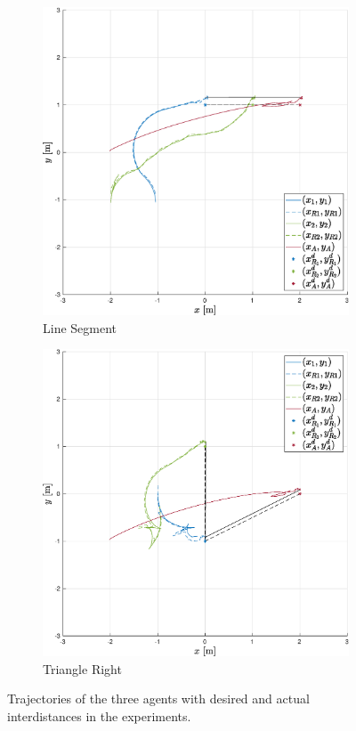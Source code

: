 \documentclass{ifacconf}
\begin{document}
\begin{figure}
\begin{subfigure}[b]{0.31\columnwidth}
        \includegraphics[width=\linewidth]{images/experiment/nominal/2nd_scenario_exp.eps}
      \caption{Line Segment}
   \end{subfigure}
    \begin{subfigure}[b]{0.31\columnwidth}
        \centering
        \includegraphics[width=\linewidth]{images/experiment/nominal/3rd_scenario_exp.eps}
        \caption{Triangle Right}
      \end{subfigure}
   \vspace{-0.2cm}
   \caption{Trajectories of the three agents with desired and actual interdistances in the experiments.}
\end{figure}
\end{document}
